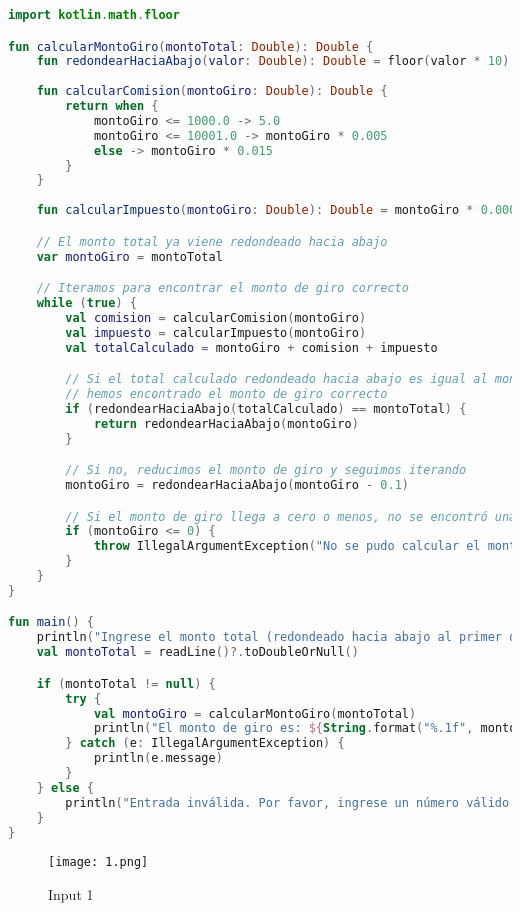 \documentclass[11pt,a4paper]{article}
\begin{document}
\begin{lstlisting}[language=Kotlin, caption={Código Kotlin para el cálculo del monto de giro}]
import kotlin.math.floor

fun calcularMontoGiro(montoTotal: Double): Double {
    fun redondearHaciaAbajo(valor: Double): Double = floor(valor * 10) / 10
    
    fun calcularComision(montoGiro: Double): Double {
        return when {
            montoGiro <= 1000.0 -> 5.0
            montoGiro <= 10001.0 -> montoGiro * 0.005
            else -> montoGiro * 0.015
        }
    }
    
    fun calcularImpuesto(montoGiro: Double): Double = montoGiro * 0.00005

    // El monto total ya viene redondeado hacia abajo
    var montoGiro = montoTotal

    // Iteramos para encontrar el monto de giro correcto
    while (true) {
        val comision = calcularComision(montoGiro)
        val impuesto = calcularImpuesto(montoGiro)
        val totalCalculado = montoGiro + comision + impuesto

        // Si el total calculado redondeado hacia abajo es igual al monto total,
        // hemos encontrado el monto de giro correcto
        if (redondearHaciaAbajo(totalCalculado) == montoTotal) {
            return redondearHaciaAbajo(montoGiro)
        }

        // Si no, reducimos el monto de giro y seguimos iterando
        montoGiro = redondearHaciaAbajo(montoGiro - 0.1)

        // Si el monto de giro llega a cero o menos, no se encontró una solución válida
        if (montoGiro <= 0) {
            throw IllegalArgumentException("No se pudo calcular el monto de giro para el monto total dado")
        }
    }
}

fun main() {
    println("Ingrese el monto total (redondeado hacia abajo al primer decimal):")
    val montoTotal = readLine()?.toDoubleOrNull()

    if (montoTotal != null) {
        try {
            val montoGiro = calcularMontoGiro(montoTotal)
            println("El monto de giro es: ${String.format("%.1f", montoGiro)}")
        } catch (e: IllegalArgumentException) {
            println(e.message)
        }
    } else {
        println("Entrada inválida. Por favor, ingrese un número válido.")
    }
}
\end{lstlisting}

\begin{figure}[H]
    \centering
    \texttt{[image: 1.png]}
    \caption{Input 1}
    \label{fig:enter-label}
\end{figure}
\end{document}
